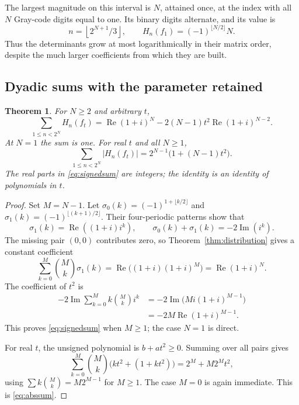 \documentclass[11pt,a4paper]{article}
\numberwithin{equation}{section}
\newtheorem{theorem}{Theorem}[section]
\theoremstyle{definition}
\theoremstyle{remark}
\newcommand{\floor}[1]{\left\lfloor #1\right\rfloor}
\begin{document}
The largest magnitude on this interval is $N$, attained once, at the
index with all $N$ Gray-code digits equal to one. Its binary digits
alternate, and its value is
\begin{equation}\label{eq:maxindex}
 n=\floor{2^{N+1}/3},\qquad
 H_n(f_1)=(-1)^{\lfloor N/2\rfloor}N.
\end{equation}
Thus the determinants grow at most logarithmically in their matrix
order, despite the much larger coefficients from which they are built.

\subsection{Dyadic sums with the parameter retained}

\begin{theorem}\label{thm:sums}
For $N\ge2$ and arbitrary $t$,
\begin{equation}\label{eq:signedsum}
 \sum_{1\le n<2^N}H_n(f_t)
 =\operatorname{Re}(1+i)^N
 -2(N-1)t^2\operatorname{Re}(1+i)^{N-2}.
\end{equation}
At $N=1$ the sum is one. For real $t$ and all $N\ge1$,
\begin{equation}\label{eq:abssum}
 \sum_{1\le n<2^N}|H_n(f_t)|
 =2^{N-1}\bigl(1+(N-1)t^2\bigr).
\end{equation}
The real parts in \eqref{eq:signedsum} are integers; the identity is
an identity of polynomials in $t$.
\end{theorem}
\begin{proof}
Set $M=N-1$. Let $\sigma_0(k)=(-1)^{1+\lfloor k/2\rfloor}$ and
$\sigma_1(k)=(-1)^{\lfloor(k+1)/2\rfloor}$. Their four-periodic patterns
show that
\[
 \sigma_1(k)=\operatorname{Re}((1+i)i^k),\qquad
 \sigma_0(k)+\sigma_1(k)=-2\operatorname{Im}(i^k).
\]
The missing pair $(0,0)$ contributes zero, so
Theorem~\ref{thm:distribution} gives a constant coefficient
\[
 \sum_{k=0}^{M}\binom Mk\sigma_1(k)
 =\operatorname{Re}\bigl((1+i)(1+i)^M\bigr)
 =\operatorname{Re}(1+i)^N.
\]
The coefficient of $t^2$ is
\begin{align*}
 -2\operatorname{Im}\sum_{k=0}^{M}k\binom Mk i^k
 &=-2\operatorname{Im}\bigl(Mi(1+i)^{M-1}\bigr)\\
 &=-2M\operatorname{Re}(1+i)^{M-1}.
\end{align*}
This proves \eqref{eq:signedsum} when $M\ge1$; the case $N=1$ is direct.

For real $t$, the unsigned polynomial is $b+a t^2\ge0$.
Summing over all pairs gives
\[
 \sum_{k=0}^{M}\binom Mk\bigl(k t^2+(1+k t^2)\bigr)
 =2^M+M2^M t^2,
\]
using $\sum k\binom Mk=M2^{M-1}$ for $M\ge1$. The case $M=0$ is
again immediate. This is \eqref{eq:abssum}.
\end{proof}
\end{document}
